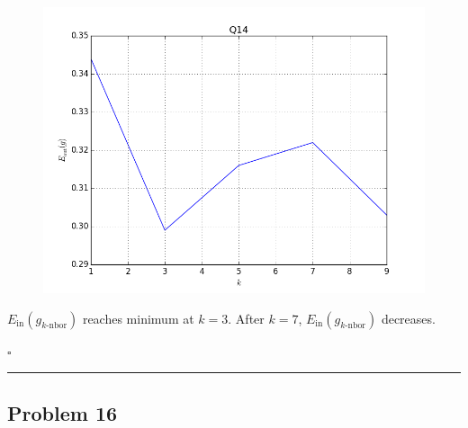 \documentclass[12pt]{article}
\newcommand*{\QEDB}{\hfill\ensuremath{\square}}
\newcommand{\ParTh}[1]{\left(#1\right)}
\newcommand{\horrule}[1]{\rule{\linewidth}{#1}}
\begin{document}
\begin{figure}[H]
	\centering
	\includegraphics[scale=0.5]{Q14.png}
\end{figure}
$E_{\text{in}}\ParTh{g_{k\text{-nbor}}}$ reaches minimum at $k=3$. After $k=7$, $E_{\text{in}}\ParTh{g_{k\text{-nbor}}}$ decreases.

\QEDB

\horrule{0.5pt}

\subsection*{Problem 16}
\end{document}

